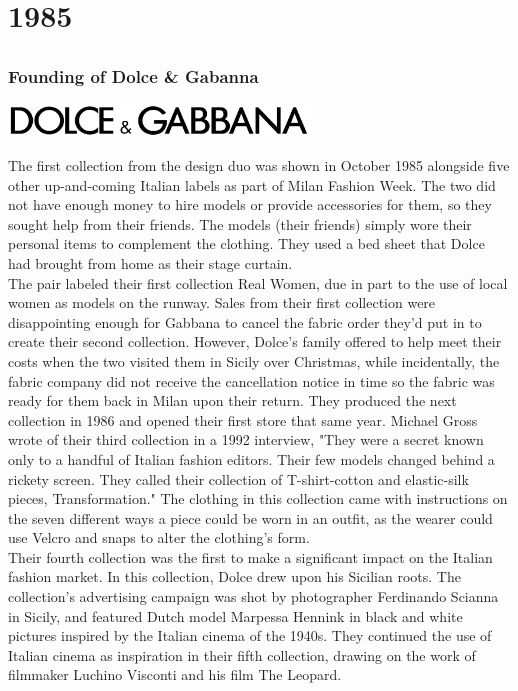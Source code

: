 \documentclass[11pt]{report}
\begin{document}
\chapter{1985}
\section{}
\subsection{Founding of Dolce \& Gabanna}
\vspace{2mm}\begin{center}\includegraphics[width=8cm]{./img/dolce&gabannaLogo.jpg}\end{center}
The first collection from the design duo was shown in October 1985 alongside five other up-and-coming Italian labels as part of Milan Fashion Week. The two did not have enough money to hire models or provide accessories for them, so they sought help from their friends. The models (their friends) simply wore their personal items to complement the clothing. They used a bed sheet that Dolce had brought from home as their stage curtain.\\ \indent The pair labeled their first collection Real Women, due in part to the use of local women as models on the runway. Sales from their first collection were disappointing enough for Gabbana to cancel the fabric order they'd put in to create their second collection. However, Dolce's family offered to help meet their costs when the two visited them in Sicily over Christmas, while incidentally, the fabric company did not receive the cancellation notice in time so the fabric was ready for them back in Milan upon their return. They produced the next collection in 1986 and opened their first store that same year. Michael Gross wrote of their third collection in a 1992 interview, "They were a secret known only to a handful of Italian fashion editors. Their few models changed behind a rickety screen. They called their collection of T-shirt-cotton and elastic-silk pieces, Transformation." The clothing in this collection came with instructions on the seven different ways a piece could be worn in an outfit, as the wearer could use Velcro and snaps to alter the clothing's form.\\ \indent Their fourth collection was the first to make a significant impact on the Italian fashion market. In this collection, Dolce drew upon his Sicilian roots. The collection's advertising campaign was shot by photographer Ferdinando Scianna in Sicily, and featured Dutch model Marpessa Hennink in black and white pictures inspired by the Italian cinema of the 1940s. They continued the use of Italian cinema as inspiration in their fifth collection, drawing on the work of filmmaker Luchino Visconti and his film The Leopard.
\end{document}
